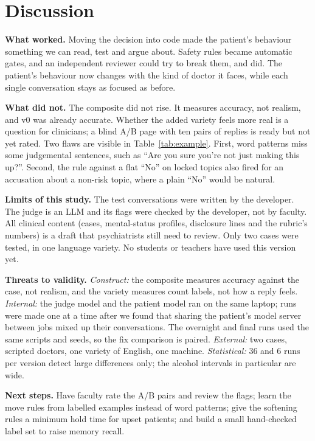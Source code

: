 \documentclass[conference]{IEEEtran}
\begin{document}
\section{Discussion}\label{sec:disc}
\textbf{What worked.} Moving the decision into code made the patient's behaviour something we can read, test and argue about. Safety rules
became automatic gates, and an independent reviewer could try to break them, and did. The patient's behaviour now changes with the kind of doctor it faces, while each single conversation stays as focused as before.

\textbf{What did not.} The composite did not rise. It measures accuracy, not realism, and v0 was already accurate. Whether the added variety
feels more real is a question for clinicians; a blind A/B page with ten pairs of replies is ready but not yet rated. Two flaws are visible in Table~\ref{tab:example}. First, word patterns miss some judgemental sentences, such as ``Are you sure you're not just making this up?''. Second, the rule against a flat ``No'' on locked topics also fired for an accusation about a non-risk topic, where a plain ``No'' would be natural.

\textbf{Limits of this study.} The test conversations were written by the developer. The judge is an LLM and its flags were checked by the
developer, not by faculty. All clinical content (cases, mental-status profiles, disclosure lines and the rubric's numbers) is a draft that
psychiatrists still need to review. Only two cases were tested, in one language variety. No students or teachers have used this version yet.

\textbf{Threats to validity.} \emph{Construct:} the composite measures accuracy against the case, not realism, and the variety measures
count labels, not how a reply feels. \emph{Internal:} the judge model and the patient model ran on the same laptop; runs were made one at a
time after we found that sharing the patient's model server between jobs mixed up their conversations. The overnight and final runs used the
same scripts and seeds, so the fix comparison is paired. \emph{External:} two cases, scripted doctors, one variety of English, one machine.
\emph{Statistical:} 36 and 6 runs per version detect large differences only; the alcohol intervals in particular are wide.

\textbf{Next steps.} Have faculty rate the A/B pairs and review the flags; learn the move rules from labelled examples instead of word patterns;
give the softening rules a minimum hold time for upset patients; and build a small hand-checked label set to raise memory recall.
\end{document}
